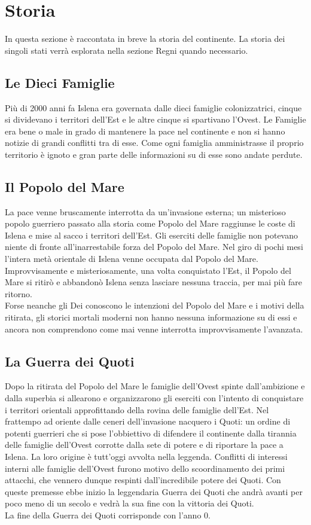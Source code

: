 \documentclass[10pt, a4paper]{report}
\begin{document}
\chapter{Storia}
\begin{multicols}{2}	
	In questa sezione è raccontata in breve la storia del continente. La storia dei singoli stati verrà esplorata nella sezione Regni quando necessario. 
\section*{Le Dieci Famiglie}
Più di 2000 anni fa Islena era governata dalle dieci famiglie colonizzatrici, cinque si dividevano i territori dell'Est e le altre cinque si spartivano l'Ovest. Le Famiglie era bene o male in grado di mantenere la pace nel continente e non si hanno notizie di grandi conflitti tra di esse. Come ogni famiglia amministrasse il proprio territorio è ignoto e gran parte delle informazioni su di esse sono andate perdute. 
\section*{Il Popolo del Mare}
La pace venne bruscamente interrotta da un’invasione esterna; un misterioso popolo guerriero passato alla storia come Popolo del Mare raggiunse le coste di Islena e mise al sacco i territori dell’Est. Gli eserciti delle famiglie non potevano niente di fronte all’inarrestabile forza del Popolo del Mare. Nel giro di pochi mesi l’intera metà orientale di Islena venne occupata dal Popolo del Mare.\\
Improvvisamente e misteriosamente, una volta conquistato l’Est, il Popolo del Mare si ritirò e abbandonò Islena senza lasciare nessuna traccia, per mai più fare ritorno. \\
Forse neanche gli Dei conoscono le intenzioni del Popolo del Mare e i motivi della ritirata, gli storici mortali moderni non hanno nessuna informazione su di essi e ancora non comprendono come mai venne interrotta improvvisamente l’avanzata. 
\section*{La Guerra dei Quoti}
Dopo la ritirata del Popolo del Mare le famiglie dell’Ovest spinte dall’ambizione e dalla superbia si allearono e organizzarono gli eserciti con l’intento di conquistare i territori orientali approfittando della rovina delle famiglie dell’Est. Nel frattempo ad oriente dalle ceneri dell’invasione nacquero i Quoti: un ordine di potenti guerrieri che si pose l’obbiettivo di difendere il continente dalla tirannia delle famiglie dell’Ovest corrotte dalla sete di potere e di riportare la pace a Islena. La loro origine è tutt’oggi avvolta nella leggenda. Conflitti di interessi interni alle famiglie dell’Ovest furono motivo dello scoordinamento dei primi attacchi, che vennero dunque respinti dall’incredibile potere dei Quoti. Con queste premesse ebbe inizio la leggendaria Guerra dei Quoti che andrà avanti per poco meno di un secolo e vedrà la sua fine con la vittoria dei Quoti.\\
La fine della Guerra dei Quoti corrisponde con l’anno 0.

\end{multicols}
\end{document}
